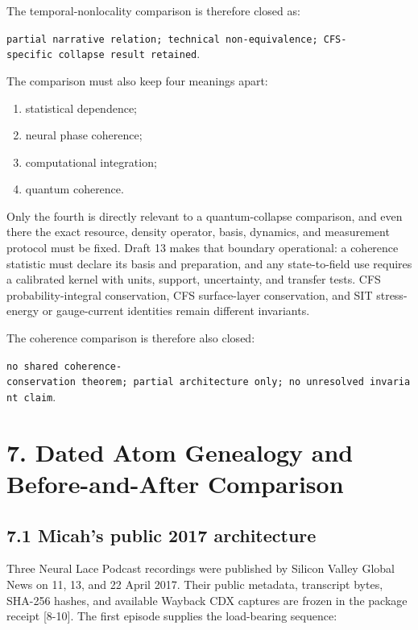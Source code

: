 \documentclass[
  american,
  11pt,
  letterpaper,
]{article}
\providecommand{\tightlist}{%
  \setlength{\itemsep}{0pt}\setlength{\parskip}{0pt}}
\begin{document}
The temporal-nonlocality comparison is therefore closed as:

\texttt{partial\ narrative\ relation;\ technical\ non-equivalence;\ CFS-specific\ collapse\ result\ retained}.

The comparison must also keep four meanings apart:

\begin{enumerate}
\def\labelenumi{\arabic{enumi}.}
\tightlist
\item
  statistical dependence;
\item
  neural phase coherence;
\item
  computational integration;
\item
  quantum coherence.
\end{enumerate}

Only the fourth is directly relevant to a quantum-collapse comparison, and even there the exact resource, density operator, basis, dynamics, and measurement protocol must be fixed. Draft 13 makes that boundary operational: a coherence statistic must declare its basis and preparation, and any state-to-field use requires a calibrated kernel with units, support, uncertainty, and transfer tests. CFS probability-integral conservation, CFS surface-layer conservation, and SIT stress-energy or gauge-current identities remain different invariants.

The coherence comparison is therefore also closed:

\texttt{no\ shared\ coherence-conservation\ theorem;\ partial\ architecture\ only;\ no\ unresolved\ invariant\ claim}.

\section{7. Dated Atom Genealogy and Before-and-After Comparison}\label{dated-atom-genealogy-and-before-and-after-comparison}

\subsection{7.1 Micah's public 2017 architecture}\label{micahs-public-2017-architecture}

Three Neural Lace Podcast recordings were published by Silicon Valley Global News on 11, 13, and 22 April 2017. Their public metadata, transcript bytes, SHA-256 hashes, and available Wayback CDX captures are frozen in the package receipt {[}8-10{]}. The first episode supplies the load-bearing sequence:
\end{document}
